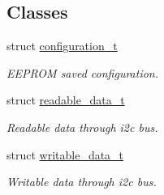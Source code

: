 \subsection*{Classes}
\begin{DoxyCompactItemize}
\item 
struct \hyperlink{structconfiguration__t}{configuration\+\_\+t}
\begin{DoxyCompactList}\small\item\em E\+E\+P\+R\+OM saved configuration. \end{DoxyCompactList}\item 
struct \hyperlink{structreadable__data__t}{readable\+\_\+data\+\_\+t}
\begin{DoxyCompactList}\small\item\em Readable data through i2c bus. \end{DoxyCompactList}\item 
struct \hyperlink{structwritable__data__t}{writable\+\_\+data\+\_\+t}
\begin{DoxyCompactList}\small\item\em Writable data through i2c bus. \end{DoxyCompactList}\end{DoxyCompactItemize}
